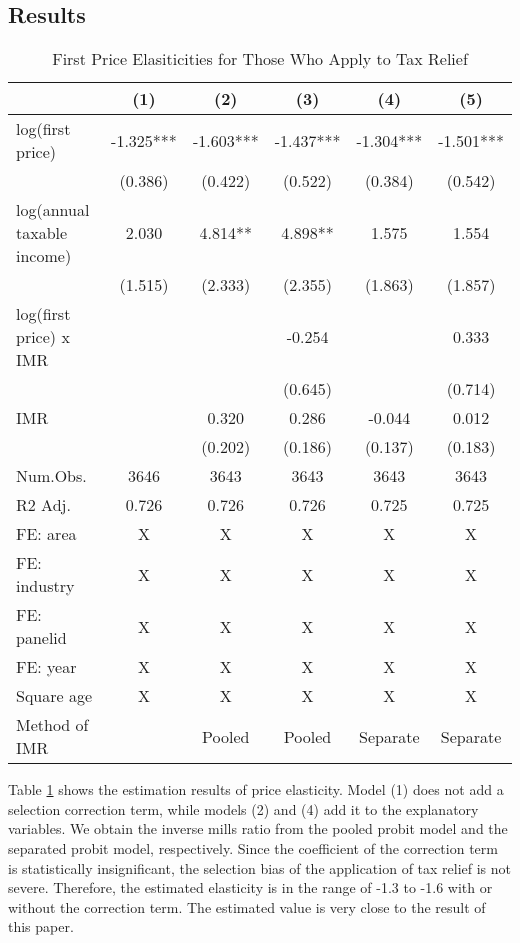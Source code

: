 \documentclass[
  11pt,
  a4paper,
]{article}
\begin{document}
\hypertarget{results-1}{%
\subsection{Results}\label{results-1}}

\begin{table}

\caption{\label{tab:benchmark}First Price Elasiticities for Those Who Apply to Tax Relief}
\centering
\begin{tabular}[t]{lccccc}
\toprule
  & (1) & (2) & (3) & (4) & (5)\\
\midrule
log(first price) & -1.325*** & -1.603*** & -1.437*** & -1.304*** & -1.501***\\
 & (0.386) & (0.422) & (0.522) & (0.384) & (0.542)\\
log(annual taxable income) & 2.030 & 4.814** & 4.898** & 1.575 & 1.554\\
 & (1.515) & (2.333) & (2.355) & (1.863) & (1.857)\\
log(first price) x IMR &  &  & -0.254 &  & 0.333\\
 &  &  & (0.645) &  & (0.714)\\
IMR &  & 0.320 & 0.286 & -0.044 & 0.012\\
 &  & (0.202) & (0.186) & (0.137) & (0.183)\\
\midrule
Num.Obs. & 3646 & 3643 & 3643 & 3643 & 3643\\
R2 Adj. & 0.726 & 0.726 & 0.726 & 0.725 & 0.725\\
FE: area & X & X & X & X & X\\
FE: industry & X & X & X & X & X\\
FE: panelid & X & X & X & X & X\\
FE: year & X & X & X & X & X\\
Square age & X & X & X & X & X\\
Method of IMR &  & Pooled & Pooled & Separate & Separate\\
\bottomrule
\end{tabular}
\end{table}

Table \ref{tab:benchmark} shows the estimation results of price elasticity.
Model (1) does not add a selection correction term,
while models (2) and (4) add it to the explanatory variables.
We obtain the inverse mills ratio from the pooled probit model
and the separated probit model, respectively.
Since the coefficient of the correction term is statistically insignificant,
the selection bias of the application of tax relief is not severe.
Therefore, the estimated elasticity is in the range of -1.3 to -1.6
with or without the correction term.
The estimated value is very close to the result of this paper.
\end{document}
